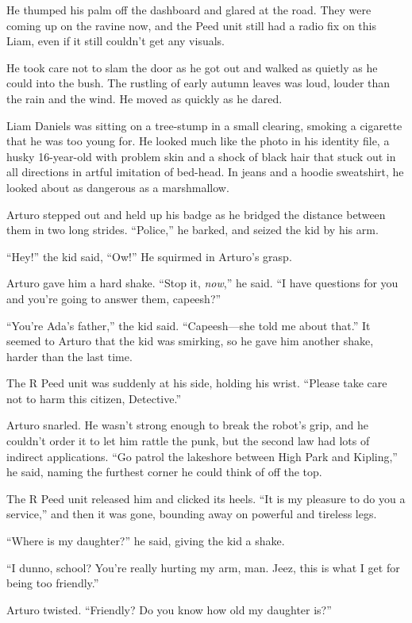 He thumped his palm off the dashboard and glared at the road. They
were coming up on the ravine now, and the Peed unit still had a
radio fix on this Liam, even if it still couldn’t get any visuals.

He took care not to slam the door as he got out and walked as
quietly as he could into the bush. The rustling of early autumn
leaves was loud, louder than the rain and the wind. He moved as
quickly as he dared.

Liam Daniels was sitting on a tree-stump in a small clearing,
smoking a cigarette that he was too young for. He looked much like
the photo in his identity file, a husky 16-year-old with problem
skin and a shock of black hair that stuck out in all directions in
artful imitation of bed-head. In jeans and a hoodie sweatshirt, he
looked about as dangerous as a marshmallow.

Arturo stepped out and held up his badge as he bridged the distance
between them in two long strides. “Police,” he barked, and seized
the kid by his arm.

“Hey!” the kid said, “Ow!” He squirmed in Arturo’s grasp.

Arturo gave him a hard shake. “Stop it, \emph{now},” he said. “I
have questions for you and you’re going to answer them, capeesh?”

“You’re Ada’s father,” the kid said. “Capeesh—she told me about
that.” It seemed to Arturo that the kid was smirking, so he gave
him another shake, harder than the last time.

The R Peed unit was suddenly at his side, holding his wrist.
“Please take care not to harm this citizen, Detective.”

Arturo snarled. He wasn’t strong enough to break the robot’s grip,
and he couldn’t order it to let him rattle the punk, but the second
law had lots of indirect applications. “Go patrol the lakeshore
between High Park and Kipling,” he said, naming the furthest corner
he could think of off the top.

The R Peed unit released him and clicked its heels. “It is my
pleasure to do you a service,” and then it was gone, bounding away
on powerful and tireless legs.

“Where is my daughter?” he said, giving the kid a shake.

“I dunno, school? You’re really hurting my arm, man. Jeez, this is
what I get for being too friendly.”

Arturo twisted. “Friendly? Do you know how old my daughter is?”

